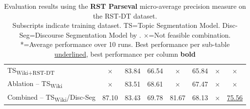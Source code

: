 \documentclass[letterpaper]{article} %
\begin{document}
\begin{table}[ht]
\begin{tabular}{lccccccc}
        TS\textsubscript{Wiki+RST-DT} &  $\times$ & 83.84 & 66.54 & $\times$ & 65.84 & $\times$ & $\times$\\
        Ablation -- TS\textsubscript{Wiki} &  $\times$ & 83.51 & 68.61 & $\times$ & 67.47 & $\times$ & $\times$ \\
        Combined -- TS\textsubscript{Wiki}/Disc-Seg & 87.10 & 83.43 & 69.78 & 81.67 & 68.13 & $\times$ & \underline{75.56} \\
        \bottomrule
    \end{tabular}
    \caption{Evaluation results using the \textbf{RST Parseval} micro-average precision measure on the RST-DT dataset. \\
    Subscripts indicate training dataset. TS=Topic Segmentation Model. Disc-Seg=Discourse Segmentation Model by \citet{wang-etal-2018-toward}. 
    $\times$=Not feasible combination. *=Average performance over 10 runs. Best performance per sub-table \underline{underlined}, best performance per column \textbf{bold}}
    \label{tab:rst_dt_results_full_rst_parse}
\end{table}
\end{document}
